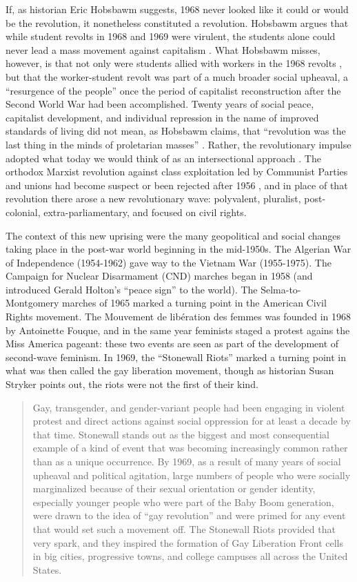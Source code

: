 \documentclass[12pt,oneside]{memoir}
\begin{document}
If, as historian Eric Hobsbawm suggests, 1968 never looked like it could or would be the revolution, it nonetheless constituted a revolution. Hobsbawm argues that while student revolts in 1968 and 1969 were virulent, the students alone could never lead a mass movement against capitalism \citep[298-299]{Hobsbawm1994}. What Hobsbawm misses, however, is that not only were students allied with workers in the 1968 revolts \cite{Feenberg2001}, but that the worker-student revolt was part of a much broader social upheaval, a ``resurgence of the people'' once the period of capitalist reconstruction after the Second World War had been accomplished. Twenty years of social peace, capitalist development, and individual repression in the name of improved standards of living did not mean, as Hobsbawm claims, that ``revolution was the last thing in the minds of proletarian masses'' \citep[299]{Hobsbawm1994}. Rather, the revolutionary impulse adopted what today we would think of as an intersectional approach \citep[7]{Taylor2017}. The orthodox Marxist revolution against class exploitation led by Communist Parties and unions had become suspect or been rejected after 1956 \citep{Hall1990}, and in place of that revolution there arose a new revolutionary wave: polyvalent, pluralist, post-colonial, extra-parliamentary, and focused on civil rights. 

The context of this new uprising were the many geopolitical and social changes taking place in the post-war world beginning in the mid-1950s. The Algerian War of Independence (1954-1962) gave way to the Vietnam War (1955-1975). The Campaign for Nuclear Disarmament (CND) marches began in 1958 (and introduced Gerald Holton's ``peace sign'' to the world). The Selma-to-Montgomery marches of 1965 marked a turning point in the American Civil Rights movement. The Mouvement de libération des femmes was founded in 1968 by Antoinette Fouque, and in the same year feminists staged a protest agains the Miss America pageant: these two events are seen as part of the development of second-wave feminism. In 1969, the ``Stonewall Riots'' marked a turning point in what was then called the gay liberation movement, though as historian Susan Stryker points out, the riots were not the first of their kind. 

\begin{quote}
Gay, transgender, and gender-variant people had been engaging in violent protest and direct actions against social oppression for at least a decade by that time. Stonewall stands out as the biggest and most consequential example of a kind of event that was becoming increasingly common rather than as a unique occurrence. By 1969, as a result of many years of social upheaval and political agitation, large numbers of people who were socially marginalized because of their sexual orientation or gender identity, especially younger people who were part of the Baby Boom generation, were drawn to the idea of ``gay revolution'' and were primed for any event that would set such a movement off. The Stonewall Riots provided that very spark, and they inspired the formation of Gay Liberation Front cells in big cities, progressive towns, and college campuses all across the United States. \citep[82]{Stryker2017}
\end{quote}
\end{document}
